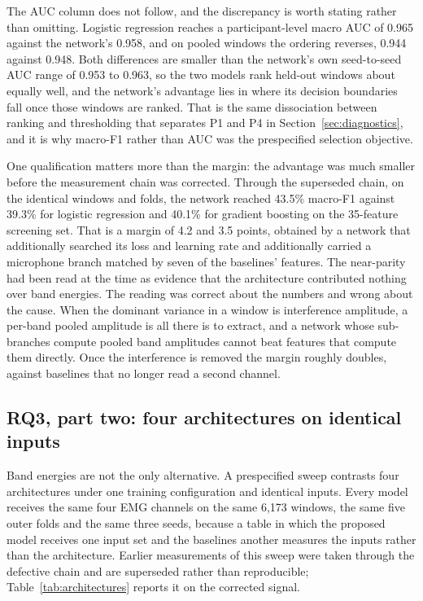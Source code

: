 \documentclass[pdflatex,sn-nature,iicol]{sn-jnl}
\begin{document}
The AUC column does not follow, and the discrepancy is worth stating rather than omitting. Logistic regression reaches a participant-level macro AUC of 0.965 against the network's 0.958, and on pooled windows the ordering reverses, 0.944 against 0.948. Both differences are smaller than the network's own seed-to-seed AUC range of 0.953 to 0.963, so the two models rank held-out windows about equally well, and the network's advantage lies in where its decision boundaries fall once those windows are ranked. That is the same dissociation between ranking and thresholding that separates P1 and P4 in Section~\ref{sec:diagnostics}, and it is why macro-F1 rather than AUC was the prespecified selection objective.

One qualification matters more than the margin: the advantage was much smaller before the measurement chain was corrected. Through the superseded chain, on the identical windows and folds, the network reached 43.5\% macro-F1 against 39.3\% for logistic regression and 40.1\% for gradient boosting on the 35-feature screening set. That is a margin of 4.2 and 3.5 points, obtained by a network that additionally searched its loss and learning rate and additionally carried a microphone branch matched by seven of the baselines' features. The near-parity had been read at the time as evidence that the architecture contributed nothing over band energies. The reading was correct about the numbers and wrong about the cause. When the dominant variance in a window is interference amplitude, a per-band pooled amplitude is all there is to extract, and a network whose sub-branches compute pooled band amplitudes cannot beat features that compute them directly. Once the interference is removed the margin roughly doubles, against baselines that no longer read a second channel.

\subsection{RQ3, part two: four architectures on identical inputs}
\label{sec:deep_baselines}

Band energies are not the only alternative. A prespecified sweep contrasts four architectures under one training configuration and identical inputs. Every model receives the same four EMG channels on the same 6,173 windows, the same five outer folds and the same three seeds, because a table in which the proposed model receives one input set and the baselines another measures the inputs rather than the architecture. Earlier measurements of this sweep were taken through the defective chain and are superseded rather than reproducible; Table~\ref{tab:architectures} reports it on the corrected signal.
\end{document}
